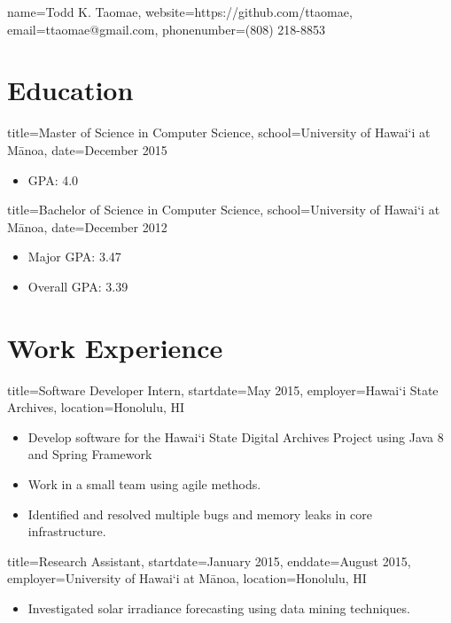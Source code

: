 \documentclass{resume}
\newcommand{\hawaii}{Hawai\lq i}
\newcommand{\uhm}{University of \hawaii{} at M\={a}noa}
\begin{document}
\begin{header}{name=Todd K. Taomae,
            website=https://github.com/ttaomae,
            email=ttaomae@gmail.com,
            phonenumber=(808) 218-8853}
\end{header}

\section*{Education}
\begin{degree}{title=Master of Science in Computer Science,
               school=\uhm,
               date=December 2015}
    \begin{itemize}
        \item{GPA: 4.0}
    \end{itemize}
\end{degree}

\begin{degree}{title=Bachelor of Science in Computer Science,
               school=\uhm,
               date=December 2012}
    \begin{itemize}
        \item{Major GPA: 3.47}
        \item{Overall GPA: 3.39}
    \end{itemize}
\end{degree}

\section*{Work Experience}
\begin{job}{title=Software Developer Intern,
            startdate=May 2015,
            employer=\hawaii{} State Archives,
            location={Honolulu, HI}}
    \begin{itemize}
        \item{Develop software for the \hawaii{} State Digital Archives Project using Java 8 and Spring Framework}
        \item{Work in a small team using agile methods.}
        \item{Identified and resolved multiple bugs and memory leaks in core infrastructure.}
    \end{itemize}
\end{job}

\begin{job}{title=Research Assistant,
            startdate=January 2015,
            enddate=August 2015,
            employer=\uhm,
            location={Honolulu, HI}}
    \begin{itemize}
        \item{Investigated solar irradiance forecasting using data mining techniques.}
    \end{itemize}
\end{job}
\end{document}
